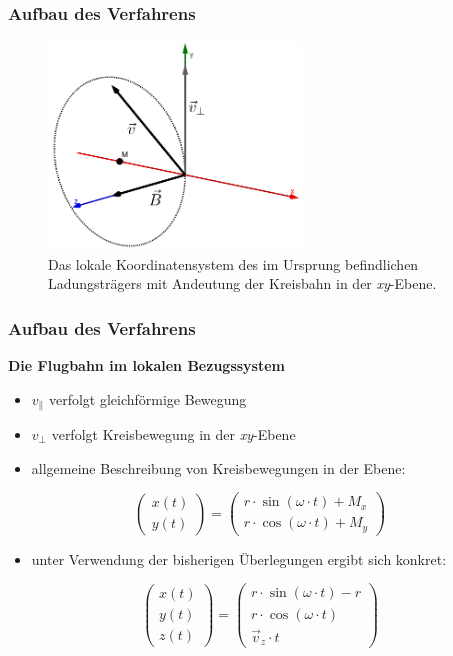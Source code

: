 \mode*
\begin{frame}
  \frametitle{Aufbau des Verfahrens}
  \begin{figure}
    \centering
    \includegraphics[width=0.6\textwidth]{../geogebra/img/local_movement_edited}
    \caption{Das lokale Koordinatensystem des im Ursprung befindlichen Ladungstr\"agers mit Andeutung der Kreisbahn in der
      \textit{xy}-Ebene.}
    \label{fig:locale_movement}
  \end{figure}
\end{frame}

\begin{frame}
  \frametitle{Aufbau des Verfahrens}
  \textbf{Die Flugbahn im lokalen Bezugssystem}
  \begin{itemize}
    \item \(v_\parallel\) verfolgt gleichf\"ormige Bewegung
    \item \(v_\perp\) verfolgt Kreisbewegung in der \textit{xy}-Ebene
    \item allgemeine Beschreibung von Kreisbewegungen in der Ebene:
  \end{itemize}
  \begin{equation*}
    \begin{pmatrix}
      x(t) \\
      y(t)
    \end{pmatrix}
    =
    \begin{pmatrix}
      r \cdot \sin{\left(\omega \cdot t\right)} + M_x \\
      r \cdot \cos{\left(\omega \cdot t\right)} + M_y
    \end{pmatrix}
  \end{equation*}
  \begin{itemize}
  \item unter Verwendung der bisherigen \"Uberlegungen ergibt sich konkret:
  \end{itemize}
  \begin{equation*}
    \begin{pmatrix}
      x(t) \\
      y(t) \\
      z(t)
    \end{pmatrix}
    =
    \begin{pmatrix}
      r \cdot \sin{\left(\omega \cdot t\right)} - r \\
      r \cdot \cos{\left(\omega \cdot t\right)} \\
      \vec{v}_z \cdot t
    \end{pmatrix}
  \end{equation*}
\end{frame}


